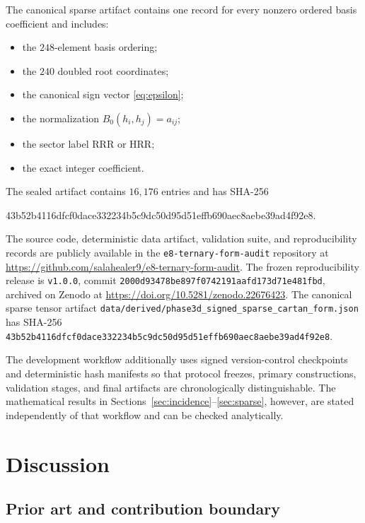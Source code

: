 \documentclass[11pt]{article}
\theoremstyle{definition}
\theoremstyle{remark}
\newcommand{\RRR}{\mathrm{RRR}}
\newcommand{\HRR}{\mathrm{HRR}}
\begin{document}
The canonical sparse artifact contains one record for every nonzero ordered basis coefficient and includes:
\begin{itemize}
\item the $248$-element basis ordering;
\item the $240$ doubled root coordinates;
\item the canonical sign vector \eqref{eq:epsilon};
\item the normalization $B_0(h_i,h_j)=a_{ij}$;
\item the sector label $\RRR$ or $\HRR$;
\item the exact integer coefficient.
\end{itemize}

The sealed artifact contains $16{,}176$ entries and has SHA-256
\begin{center}
\small\ttfamily
43b52b4116dfcf0dace332234b5c9dc50d95d51effb690aec8aebe39ad4f92e8.
\end{center}
The source code, deterministic data artifact, validation suite, and reproducibility records are publicly available in the \texttt{e8-ternary-form-audit} repository at \url{https://github.com/salahealer9/e8-ternary-form-audit}.
The frozen reproducibility release is \texttt{v1.0.0}, commit \texttt{2000d93478be897f0742191aafd173d71e481fbd}, archived on Zenodo at \url{https://doi.org/10.5281/zenodo.22676423}.
The canonical sparse tensor artifact \nolinkurl{data/derived/phase3d_signed_sparse_cartan_form.json} has SHA-256 \nolinkurl{43b52b4116dfcf0dace332234b5c9dc50d95d51effb690aec8aebe39ad4f92e8}.

The development workflow additionally uses signed version-control checkpoints and deterministic hash manifests so that protocol freezes, primary constructions, validation stages, and final artifacts are chronologically distinguishable.  The mathematical results in Sections~\ref{sec:incidence}--\ref{sec:sparse}, however, are stated independently of that workflow and can be checked analytically.

\section{Discussion}\label{sec:discussion}

\subsection{Prior art and contribution boundary}\label{sec:priorart}
\end{document}
